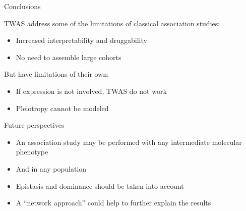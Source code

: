 \documentclass[aspectratio=169,12pt]{beamer}
\begin{document}
\begin{frame}{Conclusions}

	TWAS address some of the limitations of classical association 
studies:

	\begin{itemize}
		\item Increased interpretability and druggability
		\item No need to assemble large cohorts
	\end{itemize}

	But have limitations of their own:

	\begin{itemize}
		\item If expression is not involved, TWAS do not work
		\item Pleiotropy cannot be modeled
	\end{itemize}

\end{frame}

\begin{frame}{Future perspectives}

	\begin{itemize}
		\item<1-> An association study may be performed with any 
intermediate molecular phenotype
		\item<2-> And in any population
		\item<3-> Epistasis and dominance should be taken into account
		\item<4-> A \enquote{network approach} could help to further 
explain the results
	\end{itemize}


\end{frame}

\appendix


\begin{frame}[plain]
	\nocite{*}
	\tiny
	\printbibliography[title=References,keyword=TWAS]
\end{frame}
\end{document}
